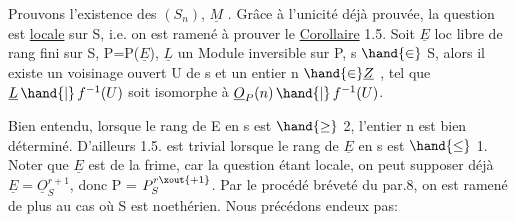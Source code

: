 
Prouvons l'existence des $(S_n)$, $\underline{M}$ . Grâce à l'unicité déjà prouvée,
la question est \uline{locale} sur S, i.e. on est ramené à prouver le
\uline{Corollaire} 1.5. Soit $\underline{E}$ loc libre de rang fini sur S, P=P($\underline{E}$), $\underline{L}$ un
Module inversible sur P, s $\hand{\in}$ S, alors il existe un voisinage ouvert U de s
et un entier n $\hand{\in} \underline{Z}$ , tel que $\underline{L}\,\hand{|}\,f^{-1}(U)$ soit isomorphe à $\underline{O}_P(n)\,\hand{|}\,f^{-1}(U)$.

\hand{\unsure{[|(}}Bien entendu, lorsque le rang de E en s est $\hand{\geq}$ 2, l'entier n est bien
déterminé. D'ailleurs 1.5. est trivial lorsque le rang de $\underline{E}$ en s est $\hand{\leq}$ 1\hand{\unsure{]|)}}.
Noter que $\underline{E}$ est de la frime, car la question étant locale, on peut supposer
déjà $\underline{E} = \underline{O}_S^{r+1}$, donc P = $P_S^{r\xout{+1}}$\hand{\unsure{]}}. Par le procédé bréveté du par.8, on est
ramené de plus au cas où S est noethérien. Nous précédons endeux pas:

